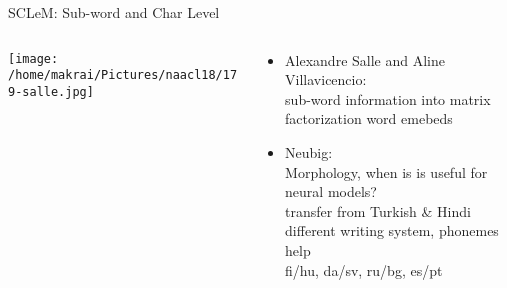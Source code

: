 \documentclass{beamer}
\begin{document}
 \begin{frame}[allowframebreaks]{SCLeM: Sub-word and Char Level}
   \begin{columns}
     \begin{column}{.35\textwidth}
       \centering
       \texttt{[image: /home/makrai/Pictures/naacl18/179-salle.jpg]}
     \end{column}
     \begin{column}{.65\textwidth}
       \begin{itemize} 
         \item
           Alexandre Salle and Aline Villavicencio: \\  
           sub-word information into matrix factorization word emebeds
         \item Neubig: \\  Morphology, when is is useful for neural models?
           \\ transfer from Turkish \& Hindi
           \\ different writing system, phonemes help
           \\ fi/hu, da/sv, ru/bg, es/pt
       \end{itemize}
     \end{column} 
   \end{columns}
 \end{frame}

\end{document}
